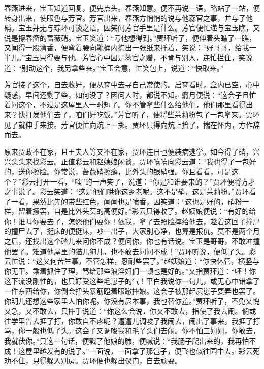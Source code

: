 春燕进来，宝玉知道回复，便先点头。春燕知意，便不再说一语，略站了一站，便转身出来，使眼色与芳官。芳官出来，春燕方悄悄的说与他蕊官之事，并与了他硝。宝玉并无与琮环可谈之语，因笑问芳官手里是什么。芳官便忙递与宝玉瞧，又说是擦春癣的蔷薇硝。宝玉笑道：“亏他想得到。”贾环听了，便伸着头瞧了一瞧，又闻得一股清香，便弯着腰向靴桶内掏出一张纸来托着，笑说：“好哥哥，给我一半儿。”宝玉只得要与他。芳官心中因是蕊官之赠，不肯与别人，连忙拦住，笑说道：“别动这个，我另拿些来。”宝玉会意，忙笑包上，说道：“快取来。”

芳官接了这个，自去收好，便从奁中去寻自己常使的。启奁看时，盒内已空，心中疑惑，早间还剩了些，如何没了？因问人时，都说不知。麝月便说：“这会子且忙着问这个，不过是这屋里人一时短了。你不管拿些什么给他们，他们那里看得出来？快打发他们去了，咱们好吃饭。”芳官听了，便将些茉莉粉包了一包拿来。贾环见了就伸手来接。芳官便忙向炕上一掷。贾环只得向炕上拾了，揣在怀内，方作辞而去。

原来贾政不在家，且王夫人等又不在家，贾环连日也便装病逃学。如今得了硝，兴兴头头来找彩云。正值彩云和赵姨娘闲谈，贾环嘻嘻向彩云道：“我也得了一包好的，送你擦脸。你常说，蔷薇硝擦癣，比外头的银硝强。你且看看，可是这个？”彩云打开一看，“嗤”的一声笑了，说道：“你是和谁要来的？”贾环便将方才之事说了。彩云笑道：“这是他们哄你这乡老呢。这不是硝，这是茉莉粉。”贾环看了一看，果然比先的带些红色，闻闻也是喷香，因笑道：“这也是好的，硝粉一样，留着擦罢，自是比外头买的高便好。”彩云只得收了。赵姨娘便说：“有好的给你！谁叫你要去了，怎怨他们耍你！依我，拿了去照脸摔给他去，趁着这回子撞尸的撞尸去了，挺床的便挺床，吵一出子，大家别心净，也算是报仇。莫不是两个月之后，还找出这个碴儿来问你不成？便问你，你也有话说。宝玉是哥哥，不敢冲撞他罢了。难道他屋里的猫儿狗儿，也不敢去问问不成！”贾环听说，便低了头。彩云忙说：“这又何苦生事，不管怎样，忍耐些罢了。”赵姨娘道：“你快休管，横竖与你无干。乘着抓住了理，骂给那些浪淫妇们一顿也是好的。”又指贾环道：“呸！你这下流没刚性的，也只好受这些毛崽子的气！平白我说你一句儿，或无心中错拿了一件东西给你，你倒会扭头暴筋瞪着眼蹾摔娘。这会子被那起屄崽子耍弄也罢了。你明儿还想这些家里人怕你呢。你没有屄本事，我也替你羞。”贾环听了，不免又愧又急，又不敢去，只摔手说道：“你这么会说，你又不敢去，指使了我去闹。倘或往学里告去捱了打，你敢自不疼呢？遭遭儿调唆了我闹去，闹出了事来，我捱了打骂，你一般也低了头。这会子又调唆我和毛丫头们去闹。你不怕三姐姐，你敢去，我就伏你。”只这一句话，便戳了他娘的肺，便喊说：“我肠子爬出来的，我再怕不成！这屋里越发有的说了。”一面说，一面拿了那包子，便飞也似往园中去。彩云死劝不住，只得躲入别房。贾环便也躲出仪门，自去顽耍。

